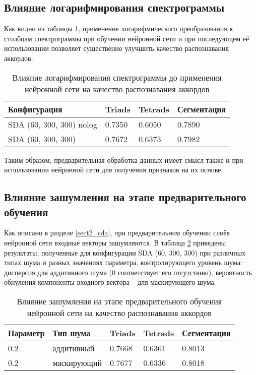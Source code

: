 \subsection{Влияние логарифмирования спектрограммы}

Как видно из таблицы \ref{Tnnlog}, применение логарифмического преобразования к
столбцам спектрограммы при обучении нейронной сети и при последующем её
использовании позволяет существенно улучшить качество распознавания аккордов.

\begin{table} [htbp]
  \centering
  \parbox{15cm}{\caption{Влияние логарифмирования спектрограммы до применения
  нейронной сети на качество распознавания аккордов} \label{Tnnlog}}
  \begin{tabular}{|l|l|l|l|}
  \hline
  Конфигурация & Triads & Tetrads & Сегментация \\
  \hline
  SDA (60, 300, 300) nolog & 0.7350 & 0.6050 & 0.7890 \\
  SDA (60, 300, 300) & 0.7672 & 0.6373 & 0.7982 \\
  \hline
  \end{tabular}
\end{table}

Таким образом, предварительная обработка данных имеет смысл также и при
использовании нейронной сети для получения признаков на их основе.

\subsection{Влияние зашумления на этапе предварительного обучения}
\label{ssect3_noise}

Как описано в разделе \ref{sect2_sda}, при предварительном обучении слоёв
нейронной сети входные векторы зашумляются. В таблица \ref{Tnnnoise} приведены
результаты, полученные для конфигурации SDA (60, 300, 300) при различных типах
шума и разных значениях параметра, контролирующего уровень шума: дисперсия для
аддитивного шума ($0$ соответствует его отсутствию), вероятность обнуления
компоненты входного вектора -- для маскирующего шума.

\begin{table} [htbp]
  \centering
  \parbox{15cm}{\caption{Влияние зашумления на этапе предварительного обучения
  нейронной сети на качество распознавания аккордов} \label{Tnnnoise}}
  \begin{tabular}{|l|l|l|l|l|}
  \hline
  Параметр & Тип шума & Triads & Tetrads & Сегментация \\
  \hline
  0.2 & аддитивный & 0.7668 & 0.6361 & 0.8013 \\
  \hline
  0.2 & маскирующий & 0.7677 & 0.6336 & 0.8018 \\
  \hline
  \end{tabular}
\end{table}

